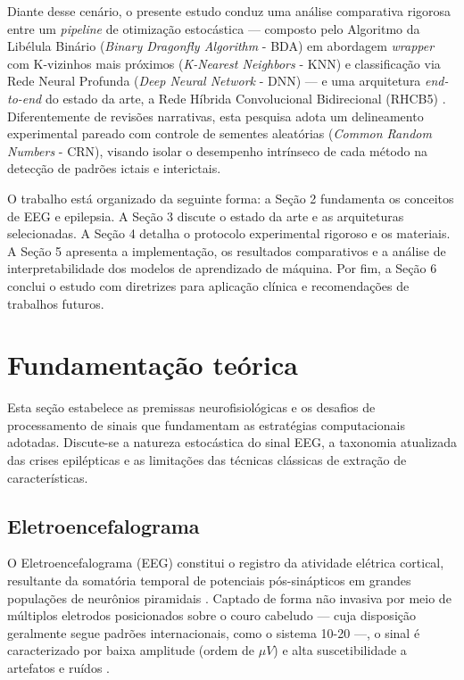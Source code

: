 \documentclass[alpha-refs,brazilian]{CC-EC_TF-TC}
\begin{document}
Diante desse cenário, o presente estudo conduz uma análise comparativa rigorosa entre um \textit{pipeline} de otimização estocástica — composto pelo Algoritmo da Libélula Binário (\textit{Binary Dragonfly Algorithm} - BDA) \citep{Emary2016,Mirjalili2016} em abordagem \textit{wrapper} com K-vizinhos mais próximos (\textit{K-Nearest Neighbors} - KNN) e classificação via Rede Neural Profunda (\textit{Deep Neural Network} - DNN) — e uma arquitetura \textit{end-to-end} do estado da arte, a Rede Híbrida Convolucional Bidirecional (RHCB5) \citep{Maggioni2023, Maggioni2024}. Diferentemente de revisões narrativas, esta pesquisa adota um delineamento experimental pareado com controle de sementes aleatórias (\textit{Common Random Numbers} - CRN), visando isolar o desempenho intrínseco de cada método na detecção de padrões ictais e interictais.

O trabalho está organizado da seguinte forma: a Seção 2 fundamenta os conceitos de EEG e epilepsia. A Seção 3 discute o estado da arte e as arquiteturas selecionadas. A Seção 4 detalha o protocolo experimental rigoroso e os materiais. A Seção 5 apresenta a implementação, os resultados comparativos e a análise de interpretabilidade dos modelos de aprendizado de máquina. Por fim, a Seção 6 conclui o estudo com diretrizes para aplicação clínica e recomendações de trabalhos futuros.

\section{Fundamentação teórica}

Esta seção estabelece as premissas neurofisiológicas e os desafios de processamento de sinais que fundamentam as estratégias computacionais adotadas. Discute-se a natureza estocástica do sinal EEG, a taxonomia atualizada das crises epilépticas e as limitações das técnicas clássicas de extração de características.

\subsection{Eletroencefalograma}

O Eletroencefalograma (EEG) constitui o registro da atividade elétrica cortical, resultante da somatória temporal de potenciais pós-sinápticos em grandes populações de neurônios piramidais \citep{Schomer2018}. Captado de forma não invasiva por meio de múltiplos eletrodos posicionados sobre o couro cabeludo — cuja disposição geralmente segue padrões internacionais, como o sistema 10-20 \citep{Jasper1958, Husain2023} —, o sinal é caracterizado por baixa amplitude (ordem de $\mu V$) e alta suscetibilidade a artefatos e ruídos \citep{Pillai2007}.
\end{document}
